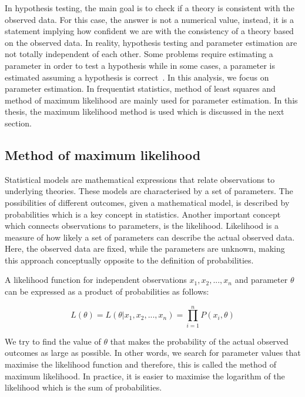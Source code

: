 In hypothesis testing, the main goal is to check if a theory is consistent with the observed data.
For this case, the answer is not a numerical value, instead, it is a statement implying 
how confident we are with the consistency of a theory based on the observed data. In reality,
hypothesis testing and parameter estimation are not totally independent of each other. 
Some problems require estimating a parameter in order to test a hypothesis while in some cases, 
a parameter is estimated assuming a hypothesis is correct~\cite{Lyons_1986}. In this analysis,
we focus on parameter estimation. In frequentist statistics, method of least squares and 
method of maximum likelihood are mainly used for parameter estimation. In this thesis, the maximum likelihood 
method is used which is discussed in the next section. 

\subsection*{Method of maximum likelihood}

Statistical models are mathematical expressions that relate observations to underlying theories.
These models are characterised by a set of parameters. The possibilities of different outcomes, 
given a mathematical model, is described by probabilities which is a key concept in statistics.
Another important concept which connects observations to parameters, is the likelihood.
Likelihood is a measure of how likely a set of parameters can describe the actual observed data. 
Here, the observed data are fixed, while the parameters are unknown, making this approach 
conceptually opposite to the definition of probabilities. 

A likelihood function for independent observations
${x_1,x_2,...,x_n}$ and parameter $\theta$ can be expressed as a product of probabilities as follows:

\begin{equation}
    L(\theta) = L(\theta | x_1,x_2,...,x_n) = \prod_{i=1}^{n} P (x_i,\theta)
\end{equation}

We try to find the value of $\theta$ that makes the probability of the actual observed outcomes as 
large as possible. In other words, we search for parameter values that maximise the likelihood function 
and therefore, this is called the method of maximum likelihood. In practice, it is easier to 
maximise the logarithm of the likelihood which is the sum of probabilities.

